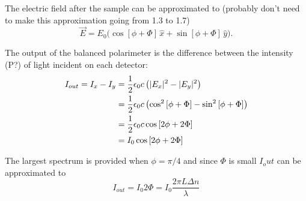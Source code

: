 The electric field after the sample can be approximated to {\color{red}(probably don't need to make this approximation going from 1.3 to 1.7)}
\begin{equation}
\vec{E} = E_0\big(\cos\left[\phi+\Phi\right]\,\hat{x}+\sin\left[\phi+\Phi\right]\,\hat{y}\big).
\end{equation}

The output of the balanced polarimeter is the difference between the intensity {\color{red}(P?)} of light incident on each detector:
\begin{align}
I_{out} = I_x - I_y &= \frac{1}{2}\epsilon_0 c \left(|E_x|^2 - |E_y|^2\right)\notag\\
&= \frac{1}{2}\epsilon_0 c \left(\cos^2\left[\phi+\Phi\right] - \sin^2\left[\phi+\Phi\right]\right)\notag\\
&= \frac{1}{2}\epsilon_0 c \cos\left[2\phi+2\Phi\right]\notag\\
&= I_0 \cos\left[2\phi+2\Phi\right]
\end{align}

The largest spectrum is provided when $\phi=\pi/4$ and since $\Phi$ is small $I_out$ can be approximated to
\begin{equation}
I_{out} = I_0 2\Phi = I_0 \frac{2\pi L \Delta n}{\lambda}
\end{equation}

